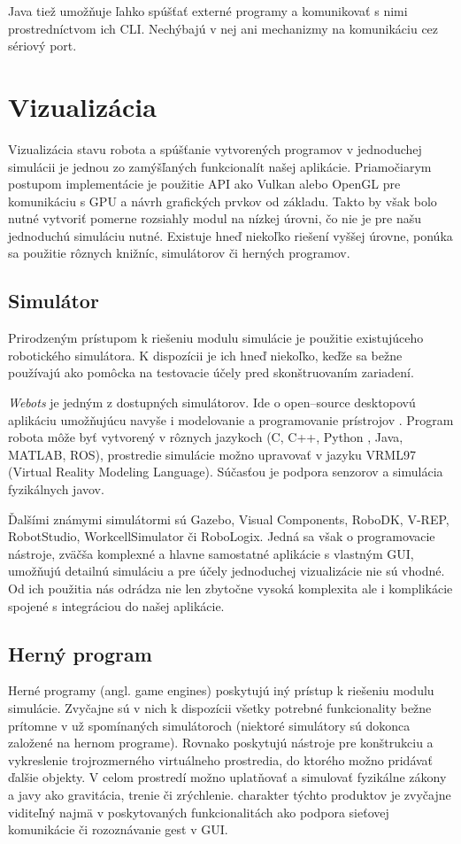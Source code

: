 Java tiež umožňuje ľahko spúšťať externé programy a komunikovať s nimi prostredníctvom ich CLI. Nechýbajú v nej ani mechanizmy na komunikáciu cez sériový port.


\section{Vizualizácia}
Vizualizácia stavu robota a spúšťanie vytvorených programov v jednoduchej simulácii je jednou zo zamýšľaných funkcionalít našej aplikácie. Priamočiarym postupom implementácie je použitie API ako Vulkan alebo OpenGL pre komunikáciu s GPU a návrh grafických prvkov od základu. Takto by však bolo nutné vytvoriť pomerne rozsiahly modul na nízkej úrovni, čo nie je pre našu jednoduchú simuláciu nutné. Existuje hneď niekoľko riešení vyššej úrovne, ponúka sa použitie rôznych knižníc, simulátorov či herných programov.

\subsection{Simulátor}
Prirodzeným prístupom k riešeniu modulu simulácie je použitie existujúceho robotického simulátora. K dispozícii je ich hneď niekoľko, keďže sa bežne používajú ako pomôcka na testovacie účely pred skonštruovaním zariadení.

\textit{Webots} je jedným z dostupných simulátorov. Ide o open--source desktopovú aplikáciu umožňujúcu navyše i modelovanie a programovanie prístrojov \cite{Webots}. Program robota môže byť vytvorený v rôznych jazykoch (C, C++, Python , Java, MATLAB, ROS), prostredie simulácie možno upravovať v jazyku VRML97 (Virtual Reality Modeling Language). Súčasťou je podpora senzorov a simulácia fyzikálnych javov.

Ďalšími známymi simulátormi sú Gazebo, Visual Components, RoboDK, V-REP, RobotStudio, WorkcellSimulator či RoboLogix. Jedná sa však o programovacie nástroje, zväčša komplexné a hlavne samostatné aplikácie s vlastným GUI, umožňujú detailnú simuláciu a pre účely jednoduchej vizualizácie nie sú vhodné. Od ich použitia nás odrádza nie len zbytočne vysoká komplexita ale i komplikácie spojené s integráciou do našej aplikácie.

\subsection{Herný program}
Herné programy (angl. game engines) poskytujú iný prístup k riešeniu modulu simulácie. Zvyčajne sú v nich k dispozícii všetky potrebné funkcionality bežne prítomne v už spomínaných simulátoroch (niektoré simulátory sú dokonca založené na hernom programe). Rovnako poskytujú nástroje pre konštrukciu a vykreslenie trojrozmerného virtuálneho prostredia, do ktorého možno pridávať ďalšie objekty. V celom prostredí možno uplatňovať a simulovať fyzikálne zákony a javy ako gravitácia, trenie či zrýchlenie.  charakter týchto produktov je zvyčajne viditeľný najmä v poskytovaných funkcionalitách ako podpora sieťovej komunikácie či rozoznávanie gest v GUI.

